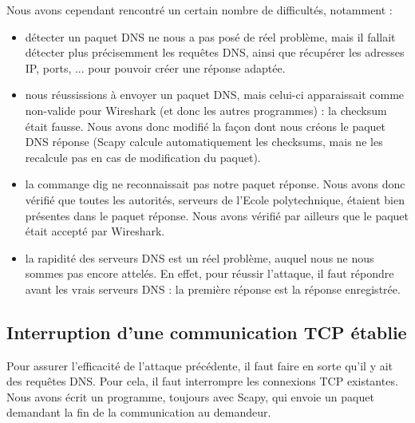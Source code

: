 \documentclass[a4paper, 12pt,twoside]{article}
\begin{document}
	Nous avons cependant rencontré un certain nombre de difficultés, notamment : \begin{itemize}
		\item détecter un paquet DNS ne nous a pas posé de réel problème, mais il fallait détecter plus précisemment les requêtes DNS, ainsi que récupérer les adresses IP, ports, ... pour pouvoir créer une réponse adaptée.
		\item nous réussissions à envoyer un paquet DNS, mais celui-ci apparaissait comme non-valide pour Wireshark (et donc les autres programmes) : la checksum était fausse. Nous avons donc modifié la façon dont nous créons le paquet DNS réponse (Scapy calcule automatiquement les checksums, mais ne les recalcule pas en cas de modification du paquet).
		\item la commange dig ne reconnaissait pas notre paquet réponse. Nous avons donc vérifié que toutes les autorités, serveurs de l'Ecole polytechnique, étaient bien présentes dans le paquet réponse. Nous avons vérifié par ailleurs que le paquet était accepté par Wireshark. 
		\item la rapidité des serveurs DNS est un réel problème, auquel nous ne nous sommes pas encore attelés. En effet, pour réussir l'attaque, il faut répondre avant les vrais serveurs DNS : la première réponse est la réponse enregistrée.
	\end{itemize}

	\subsection{Interruption d'une communication TCP établie}
	
	Pour assurer l'efficacité de l'attaque précédente, il faut faire en sorte qu'il y ait des requêtes DNS. Pour cela, il faut interrompre les connexions TCP existantes. Nous avons écrit un programme, toujours avec Scapy, qui envoie un paquet demandant la fin de la communication au demandeur. 
	
\end{document}

